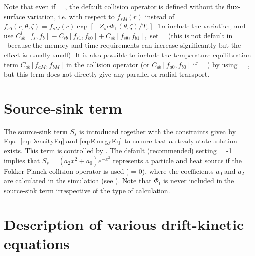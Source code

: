 Note that even if  = \true, the default collision operator is defined without the flux-surface variation, i.e. with respect to $f_{sM}\left(r\right)$ instead of $\displaystyle f_{s0}\left(r,\theta,\zeta\right) = f_{sM}\left(r\right) \exp \left[- Z_s e \Phi_1(\theta,\zeta) / T_s \right]$. 
To include the variation, and use 
$ \displaystyle
C_{sb}^{l}\left[f_s, f_b\right] \equiv C_{s b}\left[f_{s 1}, f_{b 0}\right] + C_{s b}\left[f_{s 0}, f_{b 1}\right],
$
set\newline {} = \true (this is not default in \sfincs~because the memory and time requirements can increase significantly but the effect is usually small). 
It is also possible to include the temperature equilibration term $C_{ab}[ f_{aM}, f_{bM}]$ in the collision operator (or $C_{ab}[ f_{a0}, f_{b0}]$ if  = \true) by using\newline {} = \true, but this term does not directly give any parallel or radial transport. 

\section{Source-sink term}
\label{sec:source-sink}
\newline
The source-sink term $S_s$ is introduced together with the constraints given by Eqs.~\eqref{eq:DensityEq} and \eqref{eq:EnergyEq} to ensure that a steady-state solution exists. 
This term is controlled by . 
The default (recommended) setting  = -1 implies that $S_s = \left(a_2 x^2 + a_0\right) e^{-x^2}$ represents a particle and heat source if the Fokker-Planck collision operator is used ( = 0), where the coefficients $a_0$ and $a_2$ are calculated in the simulation (see ).
\newline{}\newline
Note that $\Phi_1$ is never included in the source-sink term irrespective of the type of calculation. 

\section{Description of various drift-kinetic equations}
\label{sec:DKequations}

